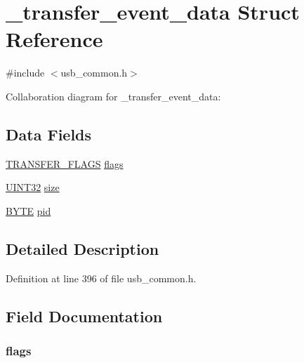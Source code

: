 \hypertarget{struct__transfer__event__data}{}\section{\+\_\+transfer\+\_\+event\+\_\+data Struct Reference}
\label{struct__transfer__event__data}


{\ttfamily \#include $<$usb\+\_\+common.\+h$>$}



Collaboration diagram for \+\_\+transfer\+\_\+event\+\_\+data\+:
\subsection*{Data Fields}
\begin{DoxyCompactItemize}
\item 
\hyperlink{union_t_r_a_n_s_f_e_r___f_l_a_g_s}{T\+R\+A\+N\+S\+F\+E\+R\+\_\+\+F\+L\+A\+G\+S} \hyperlink{struct__transfer__event__data_a0e968e27c96ea986123539dacc9c1175}{flags}
\item 
\hyperlink{_generic_type_defs_8h_a1720f33f59b583f0c2ed071815623a86}{U\+I\+N\+T32} \hyperlink{struct__transfer__event__data_a6d4bac4be8d2f0ee400eb63ac2204aac}{size}
\item 
\hyperlink{_generic_type_defs_8h_a4ae1dab0fb4b072a66584546209e7d58}{B\+Y\+T\+E} \hyperlink{struct__transfer__event__data_a52de365b57c2f7a8b4302c9341d7aa9c}{pid}
\end{DoxyCompactItemize}


\subsection{Detailed Description}


Definition at line 396 of file usb\+\_\+common.\+h.



\subsection{Field Documentation}
\hypertarget{struct__transfer__event__data_a0e968e27c96ea986123539dacc9c1175}{}
\subsubsection[{flags}]{ flags}\label{struct__transfer__event__data_a0e968e27c96ea986123539dacc9c1175}



